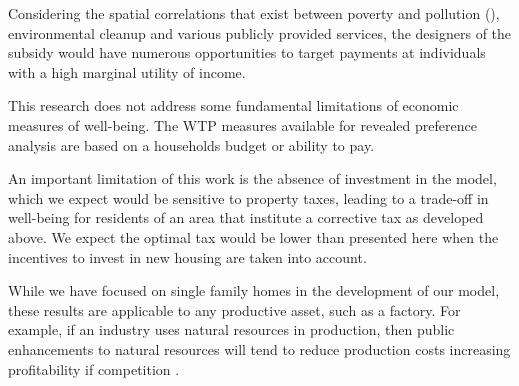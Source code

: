 \documentclass[ecta,nameyear,draft]{econsocart}
\theoremstyle{plain}
\theoremstyle{remark}
\begin{document}
Considering the spatial correlations that exist between poverty and pollution (\cite{banzhafJustice19}), environmental cleanup and various publicly provided services, the designers of the subsidy would have numerous opportunities to target payments at individuals with a high marginal utility of income.

This research does not address some fundamental limitations of economic measures of well-being. The WTP measures available for revealed preference analysis are based on a households budget or ability to pay. 

An important limitation of this work is the absence of investment in the model, which we expect would be sensitive to property taxes, leading to a trade-off in well-being for residents of an area that institute a corrective tax as developed above. We expect the optimal tax would be lower than presented here when the incentives to invest in new housing are taken into account. 

While we have focused on single family homes in the development of our model, these results are applicable to any productive asset, such as a factory. For example, if an industry uses natural resources in production, then public enhancements to natural resources will tend to reduce production costs increasing profitability if competition . 
\end{document}
